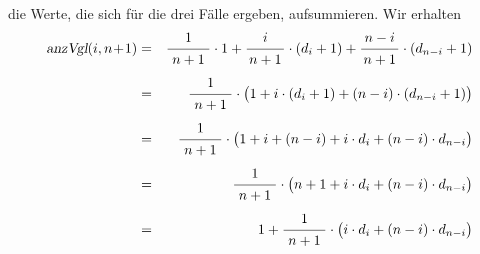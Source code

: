 die Werte, die sich f\"ur die drei F\"alle ergeben, aufsummieren.  Wir erhalten
\begin{eqnarray*}
  \textsl{anzVgl}(i, n\!+\!1) 
& = & \bruch{1}{\,n+1\,} \cdot 1 + \bruch{i}{n+1} \cdot (d_i + 1) + \bruch{n-i}{n+1} \cdot (d_{n-i} + 1) 
      \\[0.2cm]
& = & \bruch{1}{\,n+1\,} \cdot \bigl(1 + i \cdot (d_i + 1) + (n-i) \cdot (d_{n-i} + 1)\bigr)      \\[0.2cm]
& = & \bruch{1}{\,n+1\,} \cdot \bigl(1 + i + (n-i) + i \cdot d_i + (n-i) \cdot d_{n-i} \bigr)    \\[0.2cm]
& = & \bruch{1}{\,n+1\,} \cdot \bigl(n + 1 + i \cdot d_i + (n-i) \cdot d_{n-i} \bigr)            \\[0.2cm]
& = & 1 + \bruch{1}{\,n+1\,} \cdot \bigl(i \cdot d_i + (n-i) \cdot d_{n-i} \bigr) 
\end{eqnarray*}


